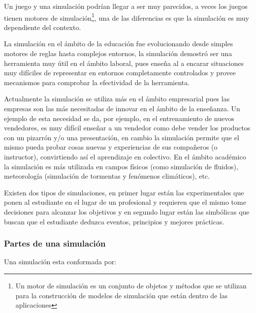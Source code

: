 Un juego y una simulación podrían llegar a ser muy parecidos, a veces los juegos
tienen motores de simulación\footnote{Un motor de simulación es un conjunto de
    objetos y métodos que se utilizan para la construcción de modelos de
    simulación que están dentro de las aplicaciones}, una de las diferencias es
que la simulación es muy dependiente del contexto. 

La simulación en el ámbito de la educación fue evolucionando desde simples
motores de reglas hasta complejos entornos, la simulación demostró ser una
herramienta muy útil en el ámbito laboral\cite{mariluz:seiousgames}, pues enseña
al  a encarar
situaciones muy difíciles de representar en entornos completamente controlados y
provee mecanismos para comprobar la efectividad de la herramienta. 

Actualmente la simulación se utiliza más en el ámbito empresarial pues las
empresas son las más necesitadas de innovar en el ámbito de la enseñanza. Un
ejemplo de esta necesidad se da, por ejemplo, en el entrenamiento de nuevos
vendedores, es muy difícil enseñar a un vendedor como debe vender los productos
con un pizarrón y/o una presentación, en cambio la simulación permite que el
mismo pueda probar cosas nuevas y experiencias de sus compañeros (o instructor),
convirtiendo así el aprendizaje en colectivo\cite{mariluz:seiousgames}. En el
ámbito académico la simulación es más utilizada en campos físicos (como
simulación de fluidos), meteorología (simulación de tormentas y fenómenos
climáticos), etc. 

Existen dos tipos de simulaciones, en primer lugar están las experimentales que
ponen al estudiante en el lugar de un profesional y requieren que el mismo tome
decisiones para alcanzar los objetivos y en segundo lugar están las simbólicas
que buscan que el estudiante deduzca eventos, principios y mejores
prácticas\cite{charsky:2010}. 


\subsubsection{Partes de una simulación}

Una simulación esta conformada por:

